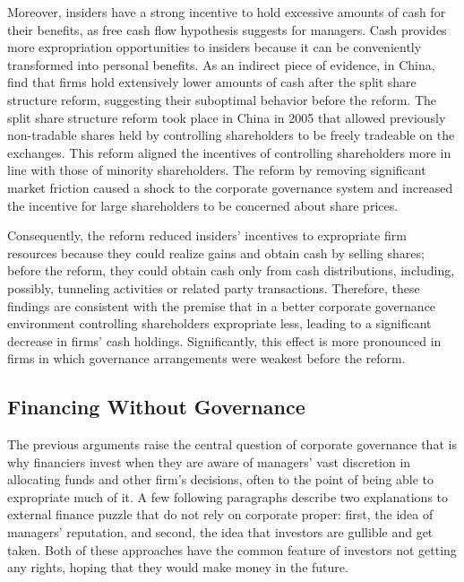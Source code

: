 \documentclass[final,1p,authoryear]{elsarticle}
\begin{document}
Moreover, insiders have a strong incentive to hold excessive amounts of cash for their benefits, as \cite{10.2307/1818789} free cash flow hypothesis suggests for managers. Cash provides more expropriation opportunities to insiders because it can be conveniently transformed into personal benefits. As an indirect piece of evidence, in China, \cite{chenetal2012} find that firms hold extensively lower amounts of cash after the split share structure reform, suggesting their suboptimal behavior before the reform. The split share structure reform took place in China in 2005 that allowed previously non-tradable shares held by controlling shareholders to be freely tradeable on the exchanges. This reform aligned the incentives of controlling shareholders more in line with those of minority shareholders. The reform by removing significant market friction caused a shock to the corporate governance system and increased the incentive for large shareholders to be concerned about share prices.

Consequently, the reform reduced insiders' incentives to expropriate firm resources because they could realize gains and obtain cash by selling shares; before the reform, they could obtain cash only from cash distributions, including, possibly, tunneling activities or related party transactions. Therefore, these findings are consistent with the premise that in a better corporate governance environment controlling shareholders expropriate less, leading to a significant decrease in firms' cash holdings. Significantly, this effect is more pronounced in firms in which governance arrangements were weakest before the reform.


\subsection{Financing Without Governance}

The previous arguments raise the central question of corporate governance that is why financiers invest when they are aware of managers' vast discretion in allocating funds and other firm's decisions, often to the point of being able to expropriate much of it. A few following paragraphs describe two explanations to external finance puzzle that do not rely on corporate proper: first, the idea of managers' reputation, and second, the idea that investors are gullible and get taken. Both of these approaches have the common feature of investors not getting any rights, hoping that they would make money in the future.
\end{document}
